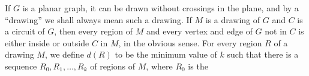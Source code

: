 
If $G$ is a planar graph, it can be drawn without crossings in the plane, and by a ``drawing'' we shall always mean such a drawing. If $M$ is a drawing of $G$ and $C$ is a circuit of $G$, then every region of $M$ and every vertex and edge of $G$ not in $C$ is either inside or outside $C$ in $M$, in the obvious sense. For every region $R$ of a drawing $M$, we define $d(R)$ to be the minimum value of $k$ such that there is a sequence $R_0, R_1, \dots, R_k$ of regions of $M$, where $R_0$ is the
